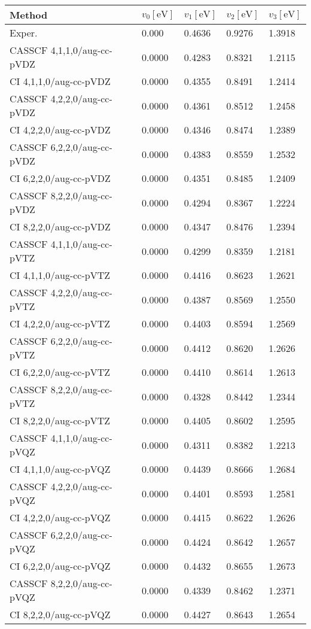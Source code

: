 
\begin{tabular}{lllll}
\toprule
Method & $v_0 [\mathrm{eV}]$ & $v_1 [\mathrm{eV}]$ & $v_2 [\mathrm{eV}]$ & $v_3[\mathrm{eV}]$ \\ \midrule
Exper. & 0.000 & 0.4636 & 0.9276 & 1.3918 \\
\midrule
CASSCF 4,1,1,0/aug-cc-pVDZ & 0.0000 & 0.4283 & 0.8321 & 1.2115\\
CI 4,1,1,0/aug-cc-pVDZ & 0.0000 & 0.4355 & 0.8491 & 1.2414\\
CASSCF 4,2,2,0/aug-cc-pVDZ & 0.0000 & 0.4361 & 0.8512 & 1.2458\\
CI 4,2,2,0/aug-cc-pVDZ & 0.0000 & 0.4346 & 0.8474 & 1.2389\\
CASSCF 6,2,2,0/aug-cc-pVDZ & 0.0000 & 0.4383 & 0.8559 & 1.2532\\
CI 6,2,2,0/aug-cc-pVDZ & 0.0000 & 0.4351 & 0.8485 & 1.2409\\
CASSCF 8,2,2,0/aug-cc-pVDZ & 0.0000 & 0.4294 & 0.8367 & 1.2224\\
CI 8,2,2,0/aug-cc-pVDZ & 0.0000 & 0.4347 & 0.8476 & 1.2394\\
CASSCF 4,1,1,0/aug-cc-pVTZ & 0.0000 & 0.4299 & 0.8359 & 1.2181\\
CI 4,1,1,0/aug-cc-pVTZ & 0.0000 & 0.4416 & 0.8623 & 1.2621\\
CASSCF 4,2,2,0/aug-cc-pVTZ & 0.0000 & 0.4387 & 0.8569 & 1.2550\\
CI 4,2,2,0/aug-cc-pVTZ & 0.0000 & 0.4403 & 0.8594 & 1.2569\\
CASSCF 6,2,2,0/aug-cc-pVTZ & 0.0000 & 0.4412 & 0.8620 & 1.2626\\
CI 6,2,2,0/aug-cc-pVTZ & 0.0000 & 0.4410 & 0.8614 & 1.2613\\
CASSCF 8,2,2,0/aug-cc-pVTZ & 0.0000 & 0.4328 & 0.8442 & 1.2344\\
CI 8,2,2,0/aug-cc-pVTZ & 0.0000 & 0.4405 & 0.8602 & 1.2595\\
CASSCF 4,1,1,0/aug-cc-pVQZ & 0.0000 & 0.4311 & 0.8382 & 1.2213\\
CI 4,1,1,0/aug-cc-pVQZ & 0.0000 & 0.4439 & 0.8666 & 1.2684\\
CASSCF 4,2,2,0/aug-cc-pVQZ & 0.0000 & 0.4401 & 0.8593 & 1.2581\\
CI 4,2,2,0/aug-cc-pVQZ & 0.0000 & 0.4415 & 0.8622 & 1.2626\\
CASSCF 6,2,2,0/aug-cc-pVQZ & 0.0000 & 0.4424 & 0.8642 & 1.2657\\
CI 6,2,2,0/aug-cc-pVQZ & 0.0000 & 0.4432 & 0.8655 & 1.2673\\
CASSCF 8,2,2,0/aug-cc-pVQZ & 0.0000 & 0.4339 & 0.8462 & 1.2371\\
CI 8,2,2,0/aug-cc-pVQZ & 0.0000 & 0.4427 & 0.8643 & 1.2654\\
\bottomrule
\end{tabular}

